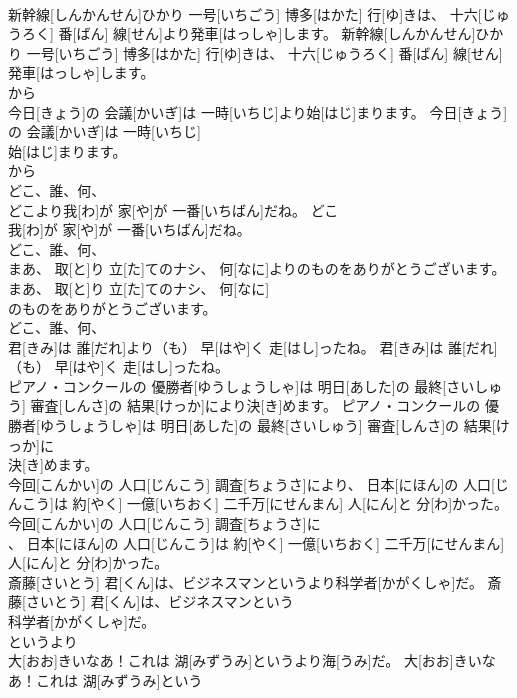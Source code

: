\documentclass[8pt]{extreport}
\begin{document}
\begin{CJK}{UTF8}{min}
\\	新幹線[しんかんせん]ひかり 一号[いちごう] 博多[はかた] 行[ゆ]きは、 十六[じゅうろく] 番[ばん] 線[せん]より発車[はっしゃ]します。	新幹線[しんかんせん]ひかり 一号[いちごう] 博多[はかた] 行[ゆ]きは、 十六[じゅうろく] 番[ばん] 線[せん]
\\	発車[はっしゃ]します。	
\\	から 
\\	今日[きょう]の 会議[かいぎ]は 一時[いちじ]より始[はじ]まります。	今日[きょう]の 会議[かいぎ]は 一時[いちじ]
\\	始[はじ]まります。	
\\	から 
\\	どこ、誰、何、
\\	どこより我[わ]が 家[や]が 一番[いちばん]だね。	どこ
\\	我[わ]が 家[や]が 一番[いちばん]だね。	
\\	どこ、誰、何、
\\	まあ、 取[と]り 立[た]てのナシ、 何[なに]よりのものをありがとうございます。	まあ、 取[と]り 立[た]てのナシ、 何[なに]
\\	のものをありがとうございます。	
\\	どこ、誰、何、
\\	君[きみ]は 誰[だれ]より（も） 早[はや]く 走[はし]ったね。	君[きみ]は 誰[だれ]
\\	（も） 早[はや]く 走[はし]ったね。	
\\	ピアノ・コンクールの 優勝者[ゆうしょうしゃ]は 明日[あした]の 最終[さいしゅう] 審査[しんさ]の 結果[けっか]により決[き]めます。	ピアノ・コンクールの 優勝者[ゆうしょうしゃ]は 明日[あした]の 最終[さいしゅう] 審査[しんさ]の 結果[けっか]に
\\	決[き]めます。	
\\	今回[こんかい]の 人口[じんこう] 調査[ちょうさ]により、 日本[にほん]の 人口[じんこう]は 約[やく] 一億[いちおく] 二千万[にせんまん] 人[にん]と 分[わ]かった。	今回[こんかい]の 人口[じんこう] 調査[ちょうさ]に
\\	、 日本[にほん]の 人口[じんこう]は 約[やく] 一億[いちおく] 二千万[にせんまん] 人[にん]と 分[わ]かった。	
\\	斎藤[さいとう] 君[くん]は、ビジネスマンというより科学者[かがくしゃ]だ。	斎藤[さいとう] 君[くん]は、ビジネスマンという
\\	科学者[かがくしゃ]だ。	
\\	というより 
\\	大[おお]きいなあ！これは 湖[みずうみ]というより海[うみ]だ。	大[おお]きいなあ！これは 湖[みずうみ]という

\end{CJK}
\end{document}
